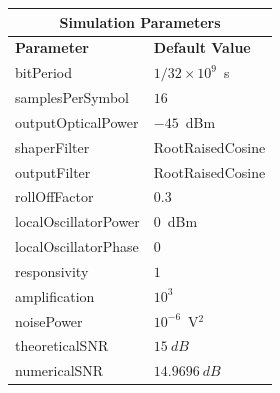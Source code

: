 \begin{refsection}
\begin{table}[H]
	\begin{tabular}{|l|l|}
		\hline
		\multicolumn{2}{|c|}{ \textbf{Simulation Parameters} } \\
		\hline
		\textbf{Parameter}     & \textbf{Default Value}                                     \\\hline
		bitPeriod              & $1/32\times10^9$~s														\\\hline
		samplesPerSymbol       & $16$                                                       \\\hline
		outputOpticalPower     & $-45$~dBm 													\\ \hline
		shaperFilter	       & RootRaisedCosine												\\ \hline
		outputFilter		   & RootRaisedCosine												\\ \hline
		rollOffFactor		   & 0.3														\\ \hline
		localOscillatorPower   & $0$~dBm                                                    \\ \hline
		localOscillatorPhase   & $0$                                                        \\ \hline
		responsivity           & $1$                                                        \\ \hline
		amplification          & $10^3$                                                     \\ \hline
		noisePower   & $10^{-6}$~V$^2$                             					\\ \hline
		theoreticalSNR  	   & $15~dB$                             					\\ \hline
		numericalSNR 		     & $14.9696~dB$                             					\\ \hline

\end{tabular}
\end{table}
\end{refsection}
